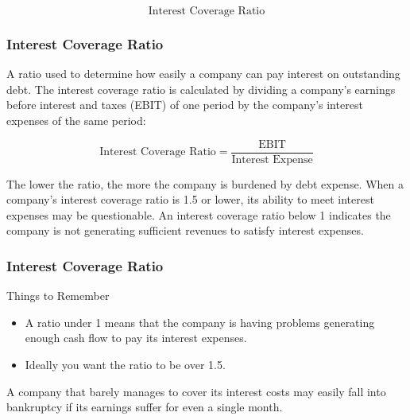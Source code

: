 \documentclass{beamer}
\begin{document}
\begin{frame}
\Large
\[
\mbox{Interest Coverage Ratio}
\]
\end{frame}

\begin{frame}
\frametitle{Interest Coverage Ratio}
A ratio used to determine how easily a company can pay interest on outstanding debt. 
The interest coverage ratio is calculated by dividing a company's earnings 
before interest and taxes (EBIT) of one period by the company's interest expenses of 
the same period:


\[\mbox{Interest Coverage Ratio} = \frac{\mbox{EBIT}}{\mbox{Interest Expense}} \]
 
The lower the ratio, the more the company is burdened by debt expense. 
When a company's interest coverage ratio is 1.5 or lower, its ability to meet interest expenses may be questionable. An interest coverage ratio below 1 indicates the company is not generating sufficient revenues to satisfy interest expenses.

\end{frame}
\begin{frame}
\frametitle{Interest Coverage Ratio}
Things to Remember 
\begin{itemize}
\item A ratio under 1 means that the company is having problems generating enough cash flow to pay its interest expenses.
\item Ideally you want the ratio to be over 1.5.
\end{itemize}

 A company that barely manages to cover its interest costs may easily fall into bankruptcy if its earnings suffer for even a single month.  
\end{frame}
\end{document}
